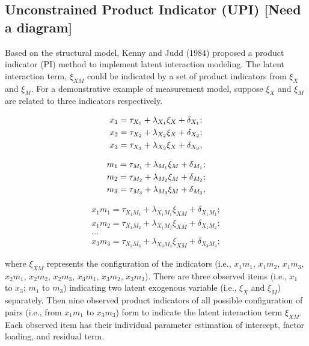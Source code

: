 \documentclass[
  man]{apa7}
\begin{document}
\hypertarget{unconstrained-product-indicator-upi-need-a-diagram}{%
\subsection{Unconstrained Product Indicator (UPI) {[}Need a diagram{]}}\label{unconstrained-product-indicator-upi-need-a-diagram}}

Based on the structural model, Kenny and Judd (1984) proposed a product indicator (PI) method to implement latent interaction modeling. The latent interaction term, \(\xi_{XM}\) could be indicated by a set of product indicators from \(\xi_{X}\) and \(\xi_{M}\). For a demonstrative example of measurement model, suppose \(\xi_{X}\) and \(\xi_{M}\) are related to three indicators respectively.

\begin{align}
    x_{1} = \tau_{X_{1}} + \lambda_{X_{1}}\xi_{X} + \delta_{X_{1}};\notag\\
    x_{2} = \tau_{X_{2}} + \lambda_{X_{2}}\xi_{X} + \delta_{X_{2}};\\
    x_{3} = \tau_{X_{3}} + \lambda_{X_{3}}\xi_{X} + \delta_{X_{3}},\notag
\end{align}

\begin{align}
    m_{1} = \tau_{M_{1}} + \lambda_{M_{1}}\xi_{M} + \delta_{M_{1}};\notag\\
    m_{2} = \tau_{M_{2}} + \lambda_{M_{2}}\xi_{M} + \delta_{M_{2}};\\
    m_{3} = \tau_{M_{3}} + \lambda_{M_{3}}\xi_{M} + \delta_{M_{3}},\notag
\end{align}

\begin{equation}
\begin{gathered}
    x_{1}m_{1} = \tau_{X_{1}M_{1}} + \lambda_{X_{1}M_{1}}\xi_{XM} + \delta_{X_{1}M_{1}};\\
    x_{1}m_{2} = \tau_{X_{1}M_{2}} + \lambda_{X_{1}M_{2}}\xi_{XM} + \delta_{X_{1}M_{2}};\\
    ...\\
    x_{3}m_{3} = \tau_{X_{3}M_{3}} + \lambda_{X_{3}M_{3}}\xi_{XM} + \delta_{X_{3}M_{3}};
\end{gathered}
\end{equation}

where \(\xi_{XM}\) represents the configuration of the indicators (i.e., \(x_{1}m_{1}\), \(x_{1}m_{2}\), \(x_{1}m_{3}\), \(x_{2}m_{1}\), \(x_{2}m_{2}\), \(x_{2}m_{3}\), \(x_{3}m_{1}\), \(x_{3}m_{2}\), \(x_{3}m_{3}\)). There are three observed items (i.e., \(x_{1}\) to \(x_3\); \(m_{1}\) to \(m_3\)) indicating two latent exogenous variable (i.e., \(\xi_{X}\) and \(\xi_{M}\)) separately. Then nine observed product indicators of all possible configuration of pairs (i.e., from \(x_{1}m_{1}\) to \(x_{3}m_{3}\)) form to indicate the latent interaction term \(\xi_{XM}\). Each observed item has their individual parameter estimation of intercept, factor loading, and residual term.
\end{document}
